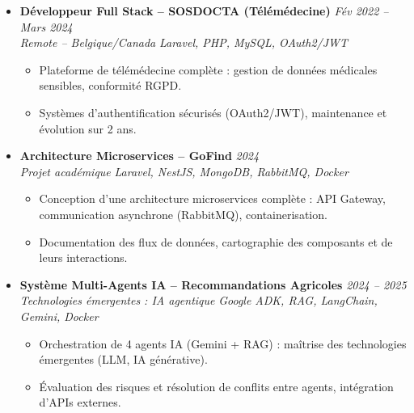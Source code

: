\documentclass[a4paper,11pt]{article}
\begin{document}
\begin{itemize}[leftmargin=*, label={-}]
\item \textbf{Développeur Full Stack -- SOSDOCTA (Télémédecine)} \hfill \textit{Fév 2022 -- Mars 2024} \\
\textit{Remote -- Belgique/Canada} \hfill \textit{Laravel, PHP, MySQL, OAuth2/JWT}
\vspace{-2pt}
    \begin{itemize}[leftmargin=0.4cm, nosep, label=\tiny$\bullet$]
        \item \small{Plateforme de télémédecine complète : gestion de données médicales sensibles, conformité RGPD.}
        \item \small{Systèmes d'authentification sécurisés (OAuth2/JWT), maintenance et évolution sur 2 ans.}
    \end{itemize}
\vspace{3pt}

\item \textbf{Architecture Microservices -- GoFind} \hfill \textit{2024} \\
\textit{Projet académique} \hfill \textit{Laravel, NestJS, MongoDB, RabbitMQ, Docker}
\vspace{-2pt}
    \begin{itemize}[leftmargin=0.4cm, nosep, label=\tiny$\bullet$]
        \item \small{Conception d'une architecture microservices complète : API Gateway, communication asynchrone (RabbitMQ), containerisation.}
        \item \small{Documentation des flux de données, cartographie des composants et de leurs interactions.}
    \end{itemize}
\vspace{3pt}

\item \textbf{Système Multi-Agents IA -- Recommandations Agricoles} \hfill \textit{2024 -- 2025} \\
\textit{Technologies émergentes : IA agentique} \hfill \textit{Google ADK, RAG, LangChain, Gemini, Docker}
\vspace{-2pt}
    \begin{itemize}[leftmargin=0.4cm, nosep, label=\tiny$\bullet$]
        \item \small{Orchestration de 4 agents IA (Gemini + RAG) : maîtrise des technologies émergentes (LLM, IA générative).}
        \item \small{Évaluation des risques et résolution de conflits entre agents, intégration d'APIs externes.}
    \end{itemize}
\vspace{3pt}

\end{itemize}
\end{document}
